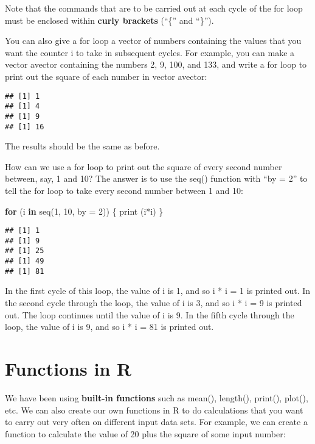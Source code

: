 \documentclass[
]{book}
\newenvironment{Shaded}{\begin{snugshade}}{\end{snugshade}}
\newcommand{\AttributeTok}[1]{\textcolor[rgb]{0.77,0.63,0.00}{#1}}
\newcommand{\ControlFlowTok}[1]{\textcolor[rgb]{0.13,0.29,0.53}{\textbf{#1}}}
\newcommand{\DecValTok}[1]{\textcolor[rgb]{0.00,0.00,0.81}{#1}}
\newcommand{\FunctionTok}[1]{\textcolor[rgb]{0.00,0.00,0.00}{#1}}
\newcommand{\NormalTok}[1]{#1}
\newcommand{\SpecialCharTok}[1]{\textcolor[rgb]{0.00,0.00,0.00}{#1}}
\begin{document}
Note that the commands that are to be carried out at each cycle of the for loop must be enclosed within \textbf{curly brackets} (``\{'' and ``\}'').

You can also give a for loop a vector of numbers containing the values that you want the counter i to take in subsequent cycles. For example, you can make a vector avector containing the numbers 2, 9, 100, and 133, and write a for loop to print out the square of each number in vector avector:

\begin{verbatim}
## [1] 1
## [1] 4
## [1] 9
## [1] 16
\end{verbatim}

The results should be the same as before.

How can we use a for loop to print out the square of every second number between, say, 1 and 10? The answer is to use the seq() function with ``by = 2'' to tell the for loop to take every second number between 1 and 10:

\begin{Shaded}
\begin{Highlighting}[]
\ControlFlowTok{for}\NormalTok{ (i }\ControlFlowTok{in} \FunctionTok{seq}\NormalTok{(}\DecValTok{1}\NormalTok{, }\DecValTok{10}\NormalTok{, }\AttributeTok{by =} \DecValTok{2}\NormalTok{)) \{ }
  \FunctionTok{print}\NormalTok{ (i}\SpecialCharTok{*}\NormalTok{i) }
\NormalTok{  \}}
\end{Highlighting}
\end{Shaded}

\begin{verbatim}
## [1] 1
## [1] 9
## [1] 25
## [1] 49
## [1] 81
\end{verbatim}

In the first cycle of this loop, the value of i is 1, and so i * i = 1 is printed out. In the second cycle through the loop, the value of i is 3, and so i * i = 9 is printed out. The loop continues until the value of i is 9. In the fifth cycle through the loop, the value of i is 9, and so i * i = 81 is printed out.

\hypertarget{functions-in-r}{%
\section{Functions in R}\label{functions-in-r}}

We have been using \textbf{built-in functions} such as mean(), length(), print(), plot(), etc. We can also create our own functions in R to do calculations that you want to carry out very often on different input data sets. For example, we can create a function to calculate the value of 20 plus the square of some input number:
\end{document}
